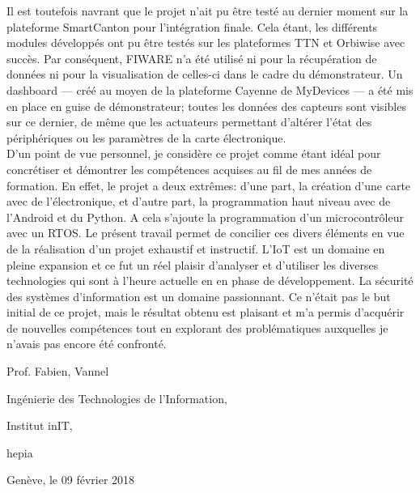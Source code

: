 Il est toutefois navrant que le projet n'ait pu être testé au dernier moment sur la plateforme SmartCanton pour l'intégration finale. Cela étant, les différents modules développés ont pu être testés sur les plateformes TTN et Orbiwise avec succès. Par conséquent, FIWARE n'a été utilisé ni pour la récupération de données ni pour la visualisation de celles-ci dans le cadre du démonstrateur. Un dashboard --- créé au moyen de la plateforme Cayenne de MyDevices --- a été mis en place en guise de démonstrateur; toutes les données des capteurs sont visibles sur ce dernier, de même que les actuateurs permettant d'altérer l'état des périphériques ou les paramètres de la carte électronique. \\

D'un point de vue personnel, je considère ce projet comme étant idéal pour concrétiser et démontrer les compétences acquises au fil de mes années de formation. En effet, le projet a deux extrêmes: d'une part, la création d'une carte avec de l'électronique, et d'autre part, la programmation haut niveau avec de l'Android et du Python. A cela s'ajoute la programmation d'un microcontrôleur avec un RTOS. Le présent travail permet de concilier ces divers éléments en vue de la réalisation d'un projet exhaustif et instructif. L'IoT est un domaine en pleine expansion et ce fut un réel plaisir d'analyser et d'utiliser les diverses technologies qui sont à l'heure actuelle en en phase de développement. La sécurité des systèmes d'information est un domaine passionnant. Ce n'était pas le but initial de ce projet, mais le résultat obtenu est plaisant et m'a permis d'acquérir de nouvelles compétences tout en explorant des problématiques auxquelles je n'avais pas encore été confronté. 





\cleardoublepage
\vspace*{5cm}
\noindent
\begin{minipage}[t]{0.4\linewidth}
\raggedright
{}
\par
Prof. Fabien, Vannel\par
Ingénierie des Technologies de l'Information, \par
Institut inIT, \par
hepia
\end{minipage}%
\hfill
\begin{minipage}[t]{0.4\linewidth}
\newline
Genève, le 09 février 2018
\end{minipage}

